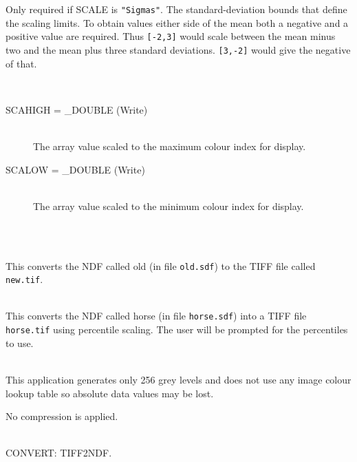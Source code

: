 \documentclass[twoside,11pt]{article}
\newcommand{\htmlref}[2]{#1}
\newcommand{\xref}[3]{#1}
\newcommand{\CONVERT}{{\footnotesize CONVERT}}
\newlength{\sstexampleslength}
\newcommand{\sstresparameters}[1]{
   \goodbreak 
   \item[Results Parameters:] \mbox{} \\
   \vspace{-3.5ex}
   \begin{description}
      #1
   \end{description}
}
\newcommand{\sstexamples}[1]{
   \goodbreak
   \item[Examples:] \mbox{} \\
   \vspace{-3.5ex}
   \begin{description}
      #1
   \end{description}
}
\newcommand{\sstsubsection}[1]{ \item[{#1}] \mbox{} \\}
\newcommand{\sstexamplesubsection}[2]{\sloppy
\item[\parbox{\sstexampleslength}{\ssttt #1}] \mbox{} \vspace{0.5ex}
\\ #2 \vspace{1.0ex}}
\newcommand{\sstnotes}[1]{\pagebreak[3] \item[Notes:] \mbox{} \\[1.3ex] #1}
\newcommand{\sstdiytopic}[2]{\goodbreak \item[{\hspace{-0.35em}#1\hspace{-0.35em}:}] \mbox{} \\[1.3ex] #2}
\newcommand{\sstresparameters}[1]{
      \item[\\ \xref{Results Parameters:}{sun95}{se_parout}] \\
      \begin{description}
         #1
      \end{description}
   }
\newcommand{\sstexamples}[1]{
   \item[\vspace{0.35ex}\htmlref{Examples:\vspace{-0.5ex}}{app_example}]
      \begin{description}
         #1
      \end{description}
      \\
   }
\newcommand{\sstsubsection}[1]{\item[{#1}]}
\newcommand{\sstexamplesubsection}[2]{
   \vspace{-1.0ex} \item[{\ssttt #1}] #2 \vspace{0.2ex}}
\newcommand{\sstnotes}[1]{\item[Notes:]
      \begin{description}
         #1
      \end{description}
   }
\newcommand{\sstdiytopic}[2]{\\ \item[{#1}:]
      \begin{description}
         #2
      \end{description}
   }
\begin{document}
{{{      }{
        Only required if SCALE is {\texttt{"Sigmas"}}.
        The standard-deviation bounds that define the scaling limits.
        To obtain values either side of the mean both a negative and
        a positive value are required.  Thus {\texttt{[-2,3]}} would scale
        between the mean minus two and the mean plus three standard
        deviations.  {\texttt{[3,-2]}} would give the negative of that.
      }
   }
   \sstresparameters{
      \sstsubsection{
        SCAHIGH = \_DOUBLE (Write)
      }{
        The array value scaled to the maximum colour index for display.
      }
      \sstsubsection{
        SCALOW = \_DOUBLE (Write)
      }{
        The array value scaled to the minimum colour index for display.
      }
   }
   \sstexamples{
      \sstexamplesubsection{
         ndf2tiff old new
      }{
         This converts the NDF called old (in file \texttt{old.sdf}) to the
         TIFF file called \texttt{new.tif}.
      }
      \sstexamplesubsection{
         ndf2tiff horse horse pe
      }{
        This converts the NDF called horse (in file \texttt{horse.sdf})
        into a TIFF file \texttt{horse.tif} using percentile scaling.
        The user will be prompted for the percentiles to use.
      }
   }
   \sstnotes{
      This application generates only 256 grey levels and does not use 
      any image colour lookup table so absolute data values may be lost.

      No compression is applied.
   }
   \sstdiytopic{
      Related Applications
   }{
      \CONVERT: \htmlref{TIFF2NDF}{TIFF2NDF}.
   }
}
\end{document}
